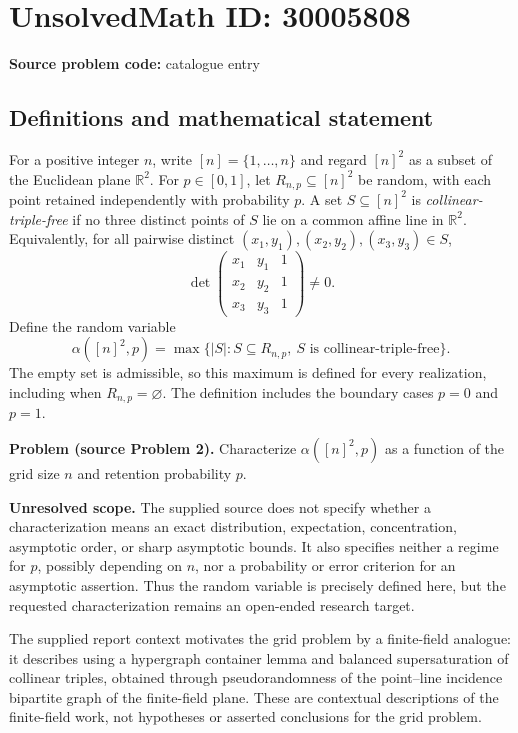 \documentclass[11pt]{article}
\newcommand{\R}{\mathbb{R}}
\begin{document}
\section*{UnsolvedMath ID: 30005808}
\textbf{Source problem code:} catalogue entry
\subsection{Definitions and mathematical statement}
For a positive integer \(n\), write \([n]=\{1,\ldots,n\}\) and regard \([n]^2\) as a subset of the Euclidean plane \(\R^2\). For \(p\in[0,1]\), let \(R_{n,p}\subseteq[n]^2\) be random, with each point retained independently with probability \(p\). A set \(S\subseteq[n]^2\) is \emph{collinear-triple-free} if no three distinct points of \(S\) lie on a common affine line in \(\R^2\). Equivalently, for all pairwise distinct \((x_1,y_1),(x_2,y_2),(x_3,y_3)\in S\),
\[
\det\begin{pmatrix}
x_1&y_1&1\\
x_2&y_2&1\\
x_3&y_3&1
\end{pmatrix}\ne0.
\]
Define the random variable
\[
\alpha([n]^2,p)=\max\bigl\{|S|:S\subseteq R_{n,p},\ S\text{ is collinear-triple-free}\bigr\}.
\]
The empty set is admissible, so this maximum is defined for every realization, including when \(R_{n,p}=\varnothing\). The definition includes the boundary cases \(p=0\) and \(p=1\).

\textbf{Problem (source Problem 2).} Characterize \(\alpha([n]^2,p)\) as a function of the grid size \(n\) and retention probability \(p\).

\textbf{Unresolved scope.} The supplied source does not specify whether a characterization means an exact distribution, expectation, concentration, asymptotic order, or sharp asymptotic bounds. It also specifies neither a regime for \(p\), possibly depending on \(n\), nor a probability or error criterion for an asymptotic assertion. Thus the random variable is precisely defined here, but the requested characterization remains an open-ended research target.

The supplied report context motivates the grid problem by a finite-field analogue: it describes using a hypergraph container lemma and balanced supersaturation of collinear triples, obtained through pseudorandomness of the point--line incidence bipartite graph of the finite-field plane. These are contextual descriptions of the finite-field work, not hypotheses or asserted conclusions for the grid problem.
\end{document}
